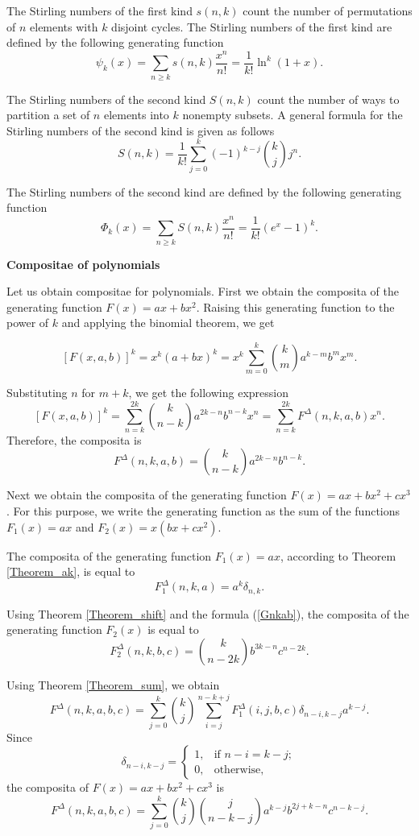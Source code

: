 \documentclass[12pt]{article}
\begin{document}
The Stirling numbers of the first kind $s(n,k)$ count the number of permutations of $n$ elements with $k$ disjoint cycles. The Stirling numbers of the first kind are defined by the following generating function
$$
\psi_k(x)=\sum_{n\geq k}  s(n,k)  \frac{x^n}{n!}=\frac{1}{k!}\ln^k(1+x).
$$

The Stirling numbers of the second kind $S(n,k)$ count the number of ways to partition a set of $n$ elements into $k$ nonempty subsets. A general formula for the Stirling numbers of the second kind is given as follows
$$S(n,k)=\frac{1}{k!}\sum_{j=0}^k(-1)^{k-j}\binom{k}{j}j^n.$$

The Stirling numbers of the second kind are defined by the following generating function
$$
\Phi_k(x)=\sum_{n\geq k} S(n,k) \frac{x^n}{n!}=\frac{1}{k!}(e^x-1)^k.
$$

\textbf{Compositae of polynomials}

Let us obtain compositae for polynomials. 
First we obtain the composita of the generating function $F(x)=ax+bx^2$. 
Raising this generating function to the power of $k$ and applying the binomial theorem, we get

$$[F(x,a,b)]^k=x^k(a+bx)^k=x^k\sum_{m=0}^k \binom{k}{m} a^{k-m}b^mx^m. 
$$

Substituting $n$ for $m+k$, we get the following expression
$$[F(x,a,b)]^k=\sum_{n=k}^{2k} \binom{k}{n-k}a^{2k-n}b^{n-k}x^n=\sum_{n=k}^{2k}F^{\Delta}(n,k,a,b)x^n. 
$$
Therefore, the composita is 
\begin{equation}
\label{Gnkab}
F^{\Delta}(n,k,a,b)=\binom{k}{n-k}a^{2k-n}b^{n-k}. 
\end{equation}

Next
we obtain the composita of the generating function $F(x)=ax+bx^2+cx^3$.
For this purpose, we write the generating function as the sum of the functions $F_1(x)=ax$ and $F_2(x)=x(bx+cx^2)$.

The composita of the generating function $F_1(x)=ax$, according to Theorem \ref{Theorem_ak}, is equal to 
$$F_1^{\Delta}(n,k,a)=a^k\delta_{n,k}.$$

Using Theorem \ref{Theorem_shift} and the formula (\ref{Gnkab}), the composita of the generating function  $F_2(x)$ is equal to
$$
F_2^{\Delta}(n,k,b,c)=\binom{k}{n-2k}b^{3k-n}c^{n-2k}. 
$$

Using Theorem \ref{Theorem_sum}, we obtain
$$
F^{\Delta}(n,k,a,b,c)=\sum_{j=0}^k{k\choose j}\sum_{i=j}^{n-k+j}F_1^{\Delta}(i,j,b,c)\delta_{n-i,k-j}a^{k-j}.
$$
Since
$$
\delta_{n-i,k-j}=\begin{cases}
 1,      & \text{if } n-i=k-j; \\
   0,        & \text{otherwise},
\end{cases}
$$
the composita of $F(x)=ax+bx^2+cx^3$ is
\begin{equation}
F^{\Delta}(n,k,a,b,c)=\sum_{j=0}^k{k\choose j}{j \choose n-k-j}a^{k-j}b^{2j+k-n}c^{n-k-j}.
\end{equation}
\end{document}
